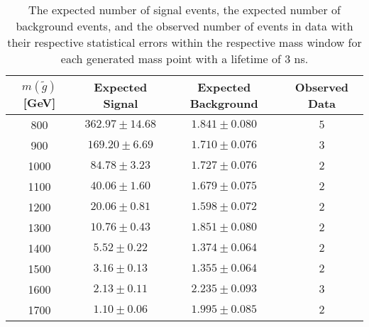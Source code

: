 \begin{table}[!htbp]
  \begin{center}
    \begin{tabular}{cccc}
      \hline
      $m(\tilde{g})$ [GeV]  & Expected Signal & Expected Background & Observed Data\\ 
      \hline
      800    & $362.97 \pm 14.68 $ & $1.841 \pm 0.080 $ & $5$ \\
      900    & $169.20 \pm 6.69 $  & $1.710 \pm 0.076 $ & $3$ \\
      1000    & $84.78 \pm 3.23 $  & $1.727 \pm 0.076 $ & $2$ \\
      1100    & $40.06 \pm 1.60 $  & $1.679 \pm 0.075 $ & $2$ \\
      1200    & $20.06 \pm 0.81 $  & $1.598 \pm 0.072 $ & $2$ \\
      1300    & $10.76 \pm 0.43 $  & $1.851 \pm 0.080 $ & $2$ \\
      1400    & $5.52 \pm 0.22 $   & $1.374 \pm 0.064 $ & $2$ \\
      1500    & $3.16 \pm 0.13 $   & $1.355 \pm 0.064 $ & $2$ \\
      1600    & $2.13 \pm 0.11 $   & $2.235 \pm 0.093 $ & $3$ \\
      1700    & $1.10 \pm 0.06 $   & $1.995 \pm 0.085 $ & $2$ \\
      \hline
    \end{tabular}
  \end{center}
  \caption{The expected number of signal events, the expected number of background events, and the observed number of events in data with their respective statistical errors within the respective mass window for each generated mass point with a lifetime of 3 ns.}
  \label{tab:app_counts_3ns}
\end{table}


